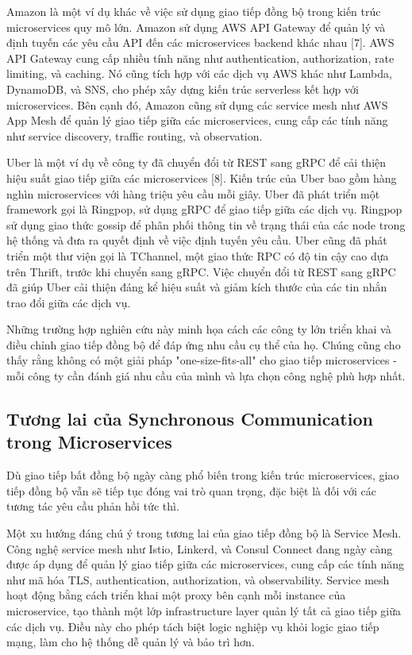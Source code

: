 Amazon là một ví dụ khác về việc sử dụng giao tiếp đồng bộ trong kiến trúc microservices quy mô lớn. Amazon sử dụng AWS API Gateway để quản lý và định tuyến các yêu cầu API đến các microservices backend khác nhau [7]. AWS API Gateway cung cấp nhiều tính năng như authentication, authorization, rate limiting, và caching. Nó cũng tích hợp với các dịch vụ AWS khác như Lambda, DynamoDB, và SNS, cho phép xây dựng kiến trúc serverless kết hợp với microservices. Bên cạnh đó, Amazon cũng sử dụng các service mesh như AWS App Mesh để quản lý giao tiếp giữa các microservices, cung cấp các tính năng như service discovery, traffic routing, và observation.

Uber là một ví dụ về công ty đã chuyển đổi từ REST sang gRPC để cải thiện hiệu suất giao tiếp giữa các microservices [8]. Kiến trúc của Uber bao gồm hàng nghìn microservices với hàng triệu yêu cầu mỗi giây. Uber đã phát triển một framework gọi là Ringpop, sử dụng gRPC để giao tiếp giữa các dịch vụ. Ringpop sử dụng giao thức gossip để phân phối thông tin về trạng thái của các node trong hệ thống và đưa ra quyết định về việc định tuyến yêu cầu. Uber cũng đã phát triển một thư viện gọi là TChannel, một giao thức RPC có độ tin cậy cao dựa trên Thrift, trước khi chuyển sang gRPC. Việc chuyển đổi từ REST sang gRPC đã giúp Uber cải thiện đáng kể hiệu suất và giảm kích thước của các tin nhắn trao đổi giữa các dịch vụ.

Những trường hợp nghiên cứu này minh họa cách các công ty lớn triển khai và điều chỉnh giao tiếp đồng bộ để đáp ứng nhu cầu cụ thể của họ. Chúng cũng cho thấy rằng không có một giải pháp "one-size-fits-all" cho giao tiếp microservices - mỗi công ty cần đánh giá nhu cầu của mình và lựa chọn công nghệ phù hợp nhất.

\subsection{Tương lai của Synchronous Communication trong Microservices}
Dù giao tiếp bất đồng bộ ngày càng phổ biến trong kiến trúc microservices, giao tiếp đồng bộ vẫn sẽ tiếp tục đóng vai trò quan trọng, đặc biệt là đối với các tương tác yêu cầu phản hồi tức thì.

Một xu hướng đáng chú ý trong tương lai của giao tiếp đồng bộ là Service Mesh. Công nghệ service mesh như Istio, Linkerd, và Consul Connect đang ngày càng được áp dụng để quản lý giao tiếp giữa các microservices, cung cấp các tính năng như mã hóa TLS, authentication, authorization, và observability. Service mesh hoạt động bằng cách triển khai một proxy bên cạnh mỗi instance của microservice, tạo thành một lớp infrastructure layer quản lý tất cả giao tiếp giữa các dịch vụ. Điều này cho phép tách biệt logic nghiệp vụ khỏi logic giao tiếp mạng, làm cho hệ thống dễ quản lý và bảo trì hơn.

